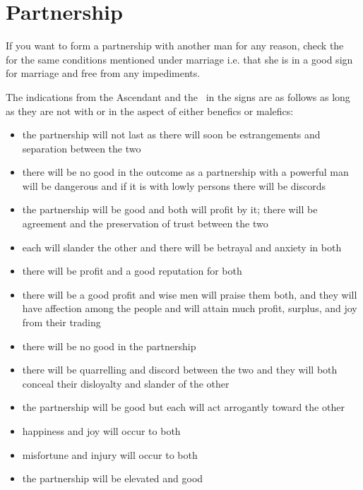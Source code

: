 \section{Partnership}
If  you want to form a partnership with another man for any reason, check the \Moon\, for the same conditions mentioned under marriage i.e. that she is in a good sign for marriage and free from any impediments.

The indications from the Ascendant and the \Moon\, in the signs are as follows as long as they are not with or in the aspect of either benefics or malefics:
\begin{itemize}[topsep=0em,itemsep=0em]
\item[\Aries] the partnership will not last as there will soon be estrangements and separation between the two
\item[\Taurus] there will be no good in the outcome as a partnership with a powerful man will be dangerous and if it is with lowly persons there will be discords
\item[\Gemini] the partnership will be good and both will profit by it; there will be agreement and the preservation of trust between the two
\item[\Cancer] each will slander the other and there will be betrayal and anxiety in both
\item[\Leo] there will be profit and a good reputation for both
\item[\Virgo] there will be a good profit and wise men will praise them both, and they will have affection among the people and will attain much profit, surplus, and joy from their trading
\item[\Libra] there will be no good in the partnership
\item[\Scorpio] there will be quarrelling and discord between the two and they will both conceal their disloyalty and slander of the other
\item[\Sagittarius] the partnership will be good but each will act arrogantly toward the other
\item[\Capricorn] happiness and joy will occur to both
\item[\Aquarius] misfortune and injury will occur to both
\item[\Pisces] the partnership will be elevated and good
\end{itemize}

